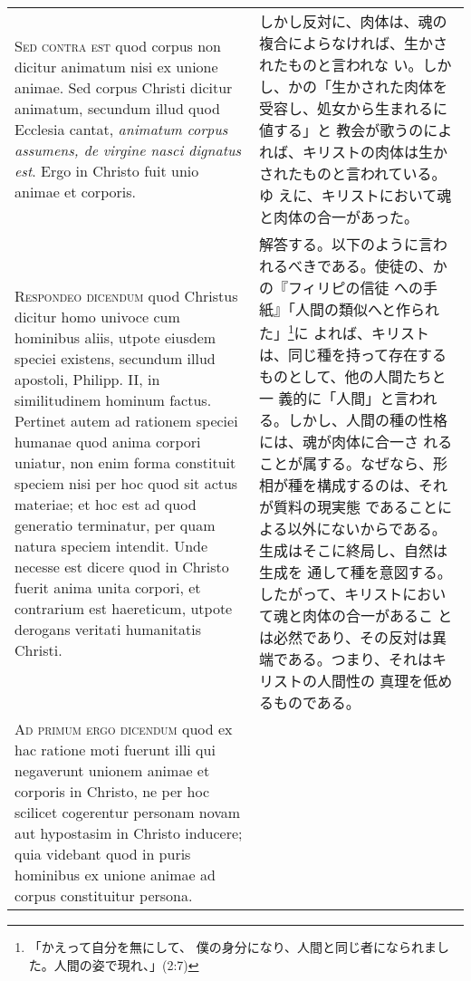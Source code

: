 \documentclass[10pt]{jsarticle} %
\begin{document}
\begin{longtable}{p{21em}p{21em}}
\\



{\scshape Sed contra est} quod corpus non dicitur animatum nisi ex
unione animae. Sed corpus Christi dicitur animatum, secundum illud
quod Ecclesia cantat, {\itshape animatum corpus assumens, de virgine
nasci dignatus est}. Ergo in Christo fuit unio animae et corporis.


&

しかし反対に、肉体は、魂の複合によらなければ、生かされたものと言われな
い。しかし、かの「生かされた肉体を受容し、処女から生まれるに値する」と
教会が歌うのによれば、キリストの肉体は生かされたものと言われている。ゆ
えに、キリストにおいて魂と肉体の合一があった。

\\



{\scshape Respondeo dicendum} quod Christus dicitur homo univoce cum
hominibus aliis, utpote eiusdem speciei existens, secundum illud
apostoli, Philipp. II, in similitudinem hominum factus. Pertinet autem
ad rationem speciei humanae quod anima corpori uniatur, non enim forma
constituit speciem nisi per hoc quod sit actus materiae; et hoc est ad
quod generatio terminatur, per quam natura speciem intendit. Unde
necesse est dicere quod in Christo fuerit anima unita corpori, et
contrarium est haereticum, utpote derogans veritati humanitatis
Christi.


&

解答する。以下のように言われるべきである。使徒の、かの『フィリピの信徒
への手紙』「人間の類似へと作られた」\footnote{「かえって自分を無にして、
僕の身分になり、人間と同じ者になられました。人間の姿で現れ、」(2:7)}に
よれば、キリストは、同じ種を持って存在するものとして、他の人間たちと一
義的に「人間」と言われる。しかし、人間の種の性格には、魂が肉体に合一さ
れることが属する。なぜなら、形相が種を構成するのは、それが質料の現実態
であることによる以外にないからである。生成はそこに終局し、自然は生成を
通して種を意図する。したがって、キリストにおいて魂と肉体の合一があるこ
とは必然であり、その反対は異端である。つまり、それはキリストの人間性の
真理を低めるものである。


\\



{\scshape Ad primum ergo dicendum} quod ex hac ratione moti fuerunt
illi qui negaverunt unionem animae et corporis in Christo, ne per hoc
scilicet cogerentur personam novam aut hypostasim in Christo inducere;
quia videbant quod in puris hominibus ex unione animae ad corpus
constituitur persona.



\end{longtable}
\end{document}
